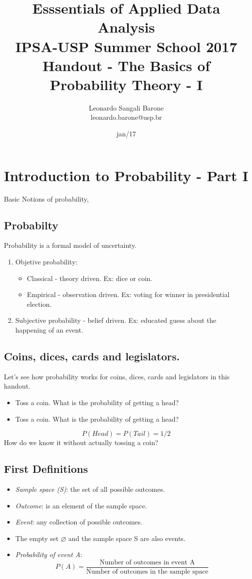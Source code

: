 \documentclass[11pt]{article}
\title{\textbf{Esssentials of Applied Data Analysis\\
				IPSA-USP Summer School 2017}\newline\\
				Handout - The Basics of Probability Theory - I}
\author{Leonardo Sangali Barone\\leonardo.barone@usp.br}
\date{jan/17}
\let\emptyset\varnothing
\begin{document}
\maketitle

\section*{Introduction to Probability - Part I}

	Basic Notions of probability,
	
	\subsection*{Probabilty}
	Probability is a formal model of uncertainty.

	\begin{enumerate}
	\item Objetive probability:
		\begin{itemize}
			\item Classical - theory driven. Ex: dice or coin.
			\item Empirical - observation driven. Ex: voting for winner in presidential election.
		\end{itemize}
	\item Subjective probability - belief driven. Ex: educated guess about the happening of an event.
	\end{enumerate}

	\subsection*{Coins, dices, cards and legislators.}
	
	Let's see how probability works for coins, dices, cards and legislators in this handout.
	
		\begin{itemize}
			\item Toss a coin. What is the probability of getting a head?
			\item Toss a coin. What is the probability of getting a head?
		\end{itemize}
	\[P(Head) = P(Tail) = 1/2	\]
	How do we know it without actually tossing a coin?

	\subsection*{First Definitions}
	\begin{itemize}
		\item \emph{Sample space (S)}: the set of all possible outcomes.
		\item \emph{Outcome}: is an element of the sample space.
		\item \emph{Event}: any collection of possible outcomes.
		\item The empty set $\emptyset$ and the sample space S are also events.	
		\item \emph{Probability of event A}:
			\[P(A) = \frac{\text{Number of outcomes in event A}}
			{\text{Number of outcomes in the sample space}}\]		
	\end {itemize}
\end{document}

